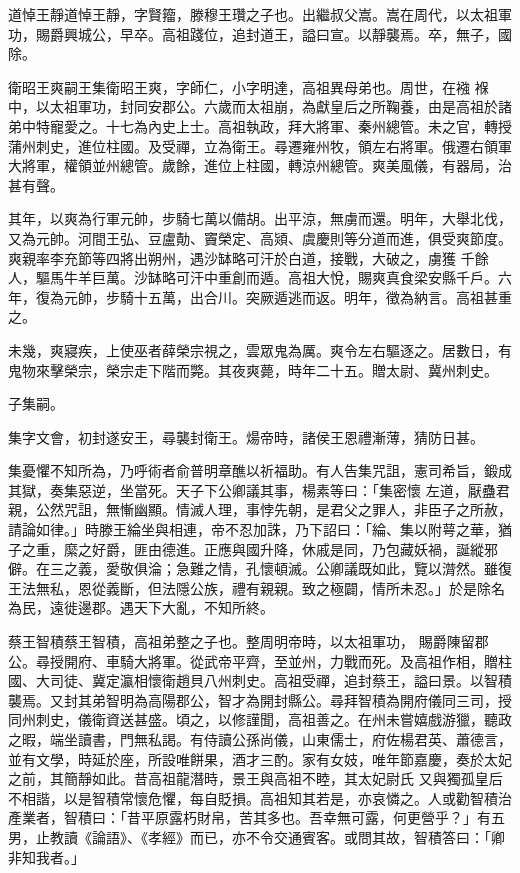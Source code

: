 \begin{pinyinscope}
 道悼王靜道悼王靜，字賢籀，滕穆王瓚之子也。出繼叔父嵩。嵩在周代，以太祖軍功，賜爵興城公，早卒。高祖踐位，追封道王，謚曰宣。以靜襲焉。卒，無子，國除。



 衛昭王爽嗣王集衛昭王爽，字師仁，小字明達，高祖異母弟也。周世，在襁
 褓中，以太祖軍功，封同安郡公。六歲而太祖崩，為獻皇后之所鞠養，由是高祖於諸弟中特寵愛之。十七為內史上士。高祖執政，拜大將軍、秦州總管。未之官，轉授蒲州刺史，進位柱國。及受禪，立為衛王。尋遷雍州牧，領左右將軍。俄遷右領軍大將軍，權領並州總管。歲餘，進位上柱國，轉涼州總管。爽美風儀，有器局，治甚有聲。



 其年，以爽為行軍元帥，步騎七萬以備胡。出平涼，無虜而還。明年，大舉北伐，又為元帥。河間王弘、豆盧勣、竇榮定、高熲、虞慶則等分道而進，俱受爽節度。爽親率李充節等四將出朔州，遇沙缽略可汗於白道，接戰，大破之，虜獲
 千餘人，驅馬牛羊巨萬。沙缽略可汗中重創而遁。高祖大悅，賜爽真食梁安縣千戶。六年，復為元帥，步騎十五萬，出合川。突厥遁逃而返。明年，徵為納言。高祖甚重之。



 未幾，爽寢疾，上使巫者薛榮宗視之，雲眾鬼為厲。爽令左右驅逐之。居數日，有鬼物來擊榮宗，榮宗走下階而斃。其夜爽薨，時年二十五。贈太尉、冀州刺史。



 子集嗣。



 集字文會，初封遂安王，尋襲封衛王。煬帝時，諸侯王恩禮漸薄，猜防日甚。



 集憂懼不知所為，乃呼術者俞普明章醮以祈福助。有人告集咒詛，憲司希旨，鍛成其獄，奏集惡逆，坐當死。天子下公卿議其事，楊素等曰：「集密懷
 左道，厭蠱君親，公然咒詛，無慚幽顯。情滅人理，事悖先朝，是君父之罪人，非臣子之所赦，請論如律。」時滕王綸坐與相連，帝不忍加誅，乃下詔曰：「綸、集以附萼之華，猶子之重，縻之好爵，匪由德進。正應與國升降，休戚是同，乃包藏妖禍，誕縱邪僻。在三之義，愛敬俱淪；急難之情，孔懷頓滅。公卿議既如此，覽以潸然。雖復王法無私，恩從義斷，但法隱公族，禮有親親。致之極闢，情所未忍。」於是除名為民，遠徙邊郡。遇天下大亂，不知所終。



 蔡王智積蔡王智積，高祖弟整之子也。整周明帝時，以太祖軍功，
 賜爵陳留郡公。尋授開府、車騎大將軍。從武帝平齊，至並州，力戰而死。及高祖作相，贈柱國、大司徒、冀定瀛相懷衛趙貝八州刺史。高祖受禪，追封蔡王，謚曰景。以智積襲焉。又封其弟智明為高陽郡公，智才為開封縣公。尋拜智積為開府儀同三司，授同州刺史，儀衛資送甚盛。頃之，以修謹聞，高祖善之。在州未嘗嬉戲游獵，聽政之暇，端坐讀書，門無私謁。有侍讀公孫尚儀，山東儒士，府佐楊君英、蕭德言，並有文學，時延於座，所設唯餅果，酒才三酌。家有女妓，唯年節嘉慶，奏於太妃之前，其簡靜如此。昔高祖龍潛時，景王與高祖不睦，其太妃尉氏
 又與獨孤皇后不相諧，以是智積常懷危懼，每自貶損。高祖知其若是，亦哀憐之。人或勸智積治產業者，智積曰：「昔平原露朽財帛，苦其多也。吾幸無可露，何更營乎？」有五男，止教讀《論語》、《孝經》而已，亦不令交通賓客。或問其故，智積答曰：「卿非知我者。」




\end{pinyinscope}
